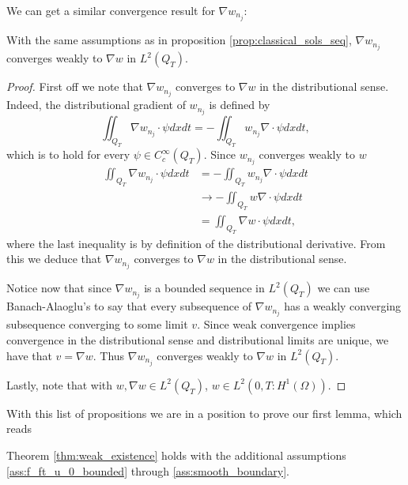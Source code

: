 \documentclass[11pt, a4paper]{article}
\begin{document}
We can get a similar convergence result for $\nabla w_{n_j}$:
\begin{proposition}
\label{prop:gradw_weak_convergence}
With the same assumptions as in proposition \ref{prop:classical_sols_seq},
$\nabla w_{n_j}$ converges weakly to $\nabla w$ in $L^2(Q_T)$.
\end{proposition}
\begin{proof}
First off we note that $\nabla w_{n_j}$ converges to $\nabla w$ in the distributional sense. Indeed, the distributional gradient of $w_{n_j}$ is defined by
	\begin{equation}
	\iint_{Q_T}\nabla w_{n_j}\cdot \psi dxdt = -\iint_{Q_T} w_{n_j} \nabla \cdot \psi dxdt ,
	\end{equation}
	which is to hold for every $\psi \in C^\infty_c(Q_T)$. Since $w_{n_j}$ converges weakly to $w$
	\begin{align*}
	\iint_{Q_T}\nabla w_{n_j} \cdot \psi dxdt &= -\iint_{Q_T} w_{n_j} \nabla \cdot \psi dxdt \\
	&\to -\iint_{Q_T} w \nabla \cdot \psi dxdt \\
	&= \iint_{Q_T} \nabla w \cdot \psi dxdt,
	\end{align*}
	where the last inequality is by definition of the distributional derivative. From this we deduce that $\nabla w_{n_j}$ converges to $\nabla w$ in the distributional sense.
	
	Notice now that since $\nabla w_{n_j}$ is a bounded sequence in $L^2(Q_T)$ we can use Banach-Alaoglu's to say that every subsequence of $\nabla w_{n_j}$ has a weakly converging subsequence converging to some limit $v$. Since weak convergence implies convergence in the distributional sense and distributional limits are unique, we have that $v=\nabla w$.
	Thus $\nabla w_{n_j}$ converges weakly to $\nabla w$ in $L^2(Q_T)$.
	
		
	 Lastly, note that with $w, \nabla w \in L^2(Q_T)$, $w \in L^2(0,T: H^1(\Omega))$.
\end{proof}

With this list of propositions we are in a position to prove our first lemma, which reads
\begin{lemma}
\label{lem:existence_part1}
Theorem \ref{thm:weak_existence} holds with the additional assumptions \ref{ass:f_ft_u_0_bounded} through \ref{ass:smooth_boundary}.
\end{lemma}
\end{document}

